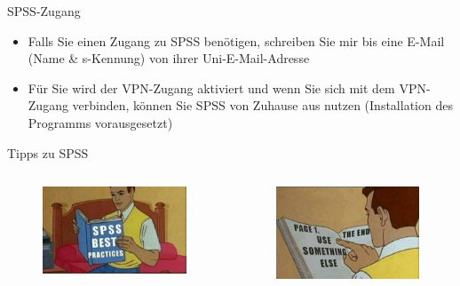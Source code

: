 \documentclass[11pt]{beamer}
\begin{document}
\begin{frame}[t]{SPSS-Zugang}
	\begin{itemize}
		\item Falls Sie einen Zugang zu SPSS benötigen, schreiben Sie mir bis  eine E-Mail (Name \& s-Kennung) von ihrer Uni-E-Mail-Adresse
		\item Für Sie wird der VPN-Zugang aktiviert und wenn Sie sich mit dem VPN-Zugang verbinden, können Sie SPSS von Zuhause aus nutzen (Installation des Programms vorausgesetzt)
	\end{itemize}
\end{frame}

\begin{frame}{Tipps zu SPSS}
	\begin{columns}
		\begin{column}{0.5\textwidth}
			\begin{center}
				\begin{figure}[ht]
					\includegraphics[width=\textwidth]{pics/pre11.png} \pause
				\end{figure}	
			\end{center}
		\end{column}
		\begin{column}{0.5\textwidth}
			\begin{center}
				\begin{figure}[ht]
					\includegraphics[width=\textwidth]{pics/pre12.png}
				\end{figure}	
			\end{center}		
		\end{column}
				

\end{columns}
\end{frame}
\end{document}

